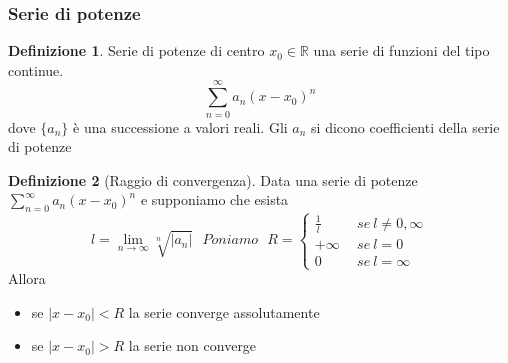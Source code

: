 \documentclass{article}
\theoremstyle{definition}
\newtheorem*{definizione}{Definizione}
\newcommand{\R}{\mathbb{R}}
\begin{document}
\subsubsection{Serie di potenze}
\begin{definizione}
	Serie di potenze di centro $x_0 \in \R$ una serie di funzioni del tipo continue. 
	$$\sum_{n=0}^{\infty}a_n(x-x_0)^n$$
	dove $\{a_n\}$ è una successione a valori reali. Gli $a_n$ si dicono coefficienti della serie di potenze
\end{definizione}
\begin{definizione}[Raggio di convergenza]
Data una serie di potenze $\sum_{n=0}^{\infty}a_n(x-x_0)^n$ e supponiamo che esista 
$$l=\lim_{n\rightarrow\infty}\sqrt[n]{|a_n|} \ \ \ Poniamo \ \ \ R=\begin{cases}
\frac{1}{l} \ \ &se \ l\neq 0,\infty \\
+\infty \ \ &se \ l=0\\
0 \ \ &se \  l=\infty

\end{cases}$$
Allora \begin{itemize}
\item se $|x-x_0|< R$ la serie converge assolutamente 
\item se $|x-x_0| > R $ la serie non converge 
\end{itemize}
\end{definizione}
\end{document}
